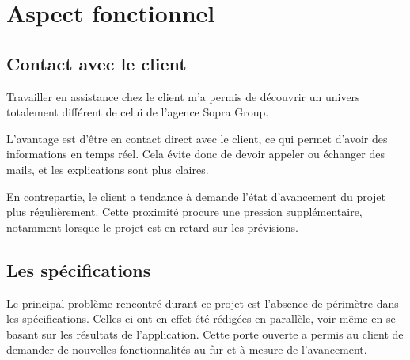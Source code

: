 
\section{Aspect fonctionnel}


\subsection{Contact avec le client}

Travailler en assistance chez le client m'a permis de découvrir un univers totalement différent de celui de l'agence Sopra Group.

L'avantage est d'être en contact direct avec le client, ce qui permet d'avoir des informations en temps réel. Cela évite donc de devoir appeler ou échanger des mails, et les explications sont plus claires.

En contrepartie, le client a tendance à demande l'état d'avancement du projet plus régulièrement.
Cette proximité procure une pression supplémentaire, notamment lorsque le projet est en retard sur les prévisions.


\subsection{Les spécifications}

Le principal problème rencontré durant ce projet est l'absence de périmètre dans les spécifications.
Celles-ci ont en effet été rédigées en parallèle, voir même en se basant sur les résultats de l'application.
Cette porte ouverte a permis au client de demander de nouvelles fonctionnalités au fur et à mesure de l'avancement.